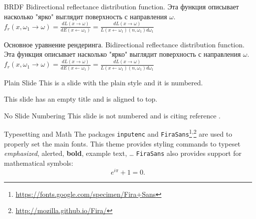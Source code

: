 \documentclass{beamer}
\begin{document}
\begin{frame}{BRDF}
	Bidirectional reflectance distribution function. Эта функция описывает насколько "ярко" выглядит поверхность с направления $\omega$.\\
	$f_r(x, \omega_1\rightarrow\omega) = \frac{dL(x\rightarrow\omega)}{dE(x\leftarrow\omega_1)} = \frac{dL(x\rightarrow\omega)}{L(x\leftarrow\omega_1)(n,\omega_1)d\omega_1}$
	
\end{frame}

\begin{frame}{Основное уравнение рендеринга.}
	Bidirectional reflectance distribution function. Эта функция описывает насколько "ярко" выглядит поверхность с направления $\omega$.\\
	$f_r(x, \omega_1\rightarrow\omega) = \frac{dL(x\rightarrow\omega)}{dE(x\leftarrow\omega_1)} = \frac{dL(x\rightarrow\omega)}{L(x\leftarrow\omega_1)(n,\omega_1)d\omega_1}$
	
\end{frame}

\begin{frame}[plain]{Plain Slide}
	This is a slide with the plain style and it is numbered.
\end{frame}


\begin{frame}[t]
	This slide has an empty title and is aligned to top.
\end{frame}


\begin{frame}[noframenumbering]{No Slide Numbering}
	This slide is not numbered and is citing reference \cite{knuth74}.
\end{frame}


\begin{frame}{Typesetting and Math}
	The packages \texttt{inputenc} and \texttt{FiraSans}\footnote{\url{https://fonts.google.com/specimen/Fira+Sans}}\textsuperscript{,}\footnote{\url{http://mozilla.github.io/Fira/}} are used to properly set the main fonts.
	\vfill
	This theme provides styling commands to typeset \emph{emphasized}, \alert{alerted}, \textbf{bold}, \textcolor{example}{example text}, \dots
	\vfill
	\texttt{FiraSans} also provides support for mathematical symbols:
	\begin{equation*}
		e^{i\pi} + 1 = 0.
	\end{equation*}
\end{frame}
\end{document}
